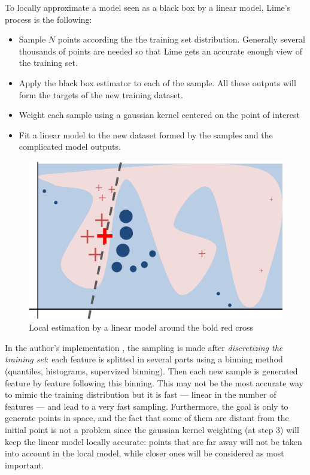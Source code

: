 \documentclass[a4paper,11pt]{kth-mag}
\begin{document}
To locally approximate a model seen as a black box by a linear model, Lime's process is the following:

\begin{itemize}
	\item Sample $N$ points according the the training set distribution. Generally several thousands of points are needed so that Lime gets an accurate enough view of the training set.
	\item Apply the black box estimator to each of the sample. All these outputs will form the targets of the new training dataset.
	\item Weight each sample using a gaussian kernel centered on the point of interest
	\item Fit a linear model to the new dataset formed by the samples and the complicated model outputs.
\end{itemize}

\begin{figure}[!h]
	\centering
   	\def\svgwidth{\columnwidth}
	\includegraphics{lime-schema.png}
    \caption{Local estimation by a linear model around the bold red cross}
\end{figure}

In the author's implementation \cite{limeGitHub}, the sampling is made after \textit{discretizing the training set}: each feature is splitted in several parts using a binning method (quantiles, histograms, supervized binning). Then each new sample is generated feature by feature following this binning. This may not be the most accurate way to mimic the training distribution but it is fast --- linear in the number of features --- and lead to a very fast sampling. Furthermore, the goal is only to generate points in space, and the fact that some of them are distant from the initial point is not a problem since the gaussian kernel weighting (at step 3) will keep the linear model locally accurate: points that are far away will not be taken into account in the local model, while closer ones will be considered as most important.
\end{document}
